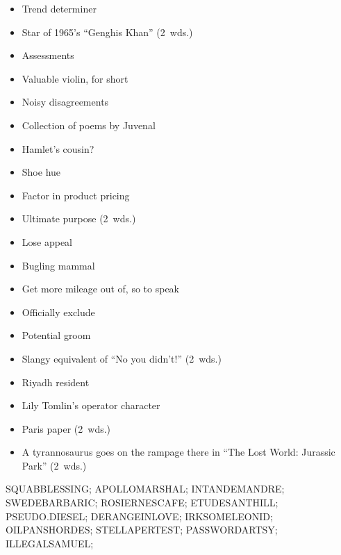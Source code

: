 {  \item
    \begin{itemize}
      \item
        Trend determiner
      \item
        Star of 1965's ``Genghis Khan'' (2~wds.)
      \item
        Assessments
      \item
        Valuable violin, for short
      \item
        Noisy disagreements
      \item
        Collection of poems by Juvenal
      \item
        Hamlet's cousin?
    \end{itemize}
  \item
    \begin{itemize}
      \item
        Shoe hue
      \item
        Factor in product pricing
      \item
        Ultimate purpose (2~wds.)
      \item
        Lose appeal
      \item
        Bugling mammal
      \item
        Get more mileage out of, so to speak
    \end{itemize}
  \item
    \begin{itemize}
      \item
        Officially exclude
      \item
        Potential groom
      \item
        Slangy equivalent of ``No you didn't!'' (2~wds.)
      \item
        Riyadh resident
    \end{itemize}
  \item
    \begin{itemize}
      \item
        Lily Tomlin's operator character
      \item
        Paris paper (2~wds.)
    \end{itemize}
  \item
    \begin{itemize}
      \item
        A tyrannosaurus goes on the rampage there in ``The Lost World: Jurassic Park'' (2~wds.)
    \end{itemize}
}{%
  \puzzlerow SQUABBLESSING;
  \puzzlerow APOLLOMARSHAL;
  \puzzlerow INTANDEMANDRE;
  \puzzlerow SWEDEBARBARIC;
  \puzzlerow ROSIERNESCAFE;
  \puzzlerow ETUDESANTHILL;
  \puzzlerow PSEUDO.DIESEL;
  \puzzlerow DERANGEINLOVE;
  \puzzlerow IRKSOMELEONID;
  \puzzlerow OILPANSHORDES;
  \puzzlerow STELLAPERTEST;
  \puzzlerow PASSWORDARTSY;
  \puzzlerow ILLEGALSAMUEL;
}
